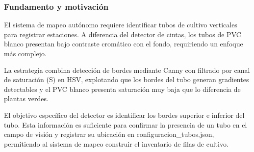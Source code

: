 \subsubsection{Fundamento y motivación}

El sistema de mapeo autónomo requiere identificar tubos de cultivo verticales para registrar estaciones. A diferencia del detector de cintas, los tubos de PVC blanco presentan bajo contraste cromático con el fondo, requiriendo un enfoque más complejo.

La estrategia combina detección de bordes mediante Canny con filtrado por canal de saturación (S) en HSV, explotando que los bordes del tubo generan gradientes detectables y el PVC blanco presenta saturación muy baja que lo diferencia de plantas verdes.

El objetivo específico del detector es identificar los bordes superior e inferior del tubo. Esta información es suficiente para confirmar la presencia de un tubo en el campo de visión y registrar su ubicación en configuracion\_tubos.json, permitiendo al sistema de mapeo construir el inventario de filas de cultivo.